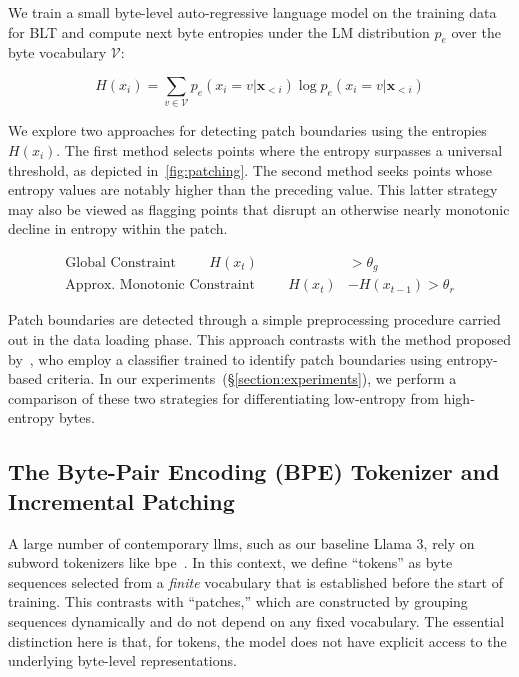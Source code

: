 We train a small byte-level auto-regressive language model on the training data for {\textsc BLT} and compute next byte entropies under the LM distribution $p_{e}$ over the byte vocabulary $\mathcal{V}$:

\begin{equation}
H(x_i) = \sum_{v \in \mathcal{V}} p_{e}(x_i=v|\pmb{x}_{<i}) \log p_{e}(x_i=v|\pmb{x}_{<i})
\end{equation}

We explore two approaches for detecting patch boundaries using the entropies $H(x_i)$. The first method selects points where the entropy surpasses a universal threshold, as depicted in~\autoref{fig:patching}. The second method seeks points whose entropy values are notably higher than the preceding value. This latter strategy may also be viewed as flagging points that disrupt an otherwise nearly monotonic decline in entropy within the patch.

\begin{align*}
    \text{Global Constraint}\hspace{1cm}H(x_t)& > \theta_g\\
    \text{Approx. Monotonic Constraint}\hspace{1cm}H(x_t)& - H(x_{t-1}) > \theta_r
\end{align*}

Patch boundaries are detected through a simple preprocessing procedure carried out in the data loading phase. This approach contrasts with the method proposed by~\citet{nawrot-etal-2023-efficient}, who employ a classifier trained to identify patch boundaries using entropy-based criteria. In our experiments~(\S\ref{section:experiments}), we perform a comparison of these two strategies for differentiating low-entropy from high-entropy bytes.

\subsection{The Byte-Pair Encoding (BPE) Tokenizer and Incremental Patching}
\label{section:incremental-patching}
\label{section:bpe-patch}

A large number of contemporary llms, such as our baseline Llama 3, rely on subword tokenizers like bpe~\citep{gage1994new, sennrich-etal-2016-neural}. In this context, we define ``tokens'' as byte sequences selected from a \textit{finite} vocabulary that is established before the start of training. This contrasts with ``patches,'' which are constructed by grouping sequences dynamically and do not depend on any fixed vocabulary. The essential distinction here is that, for tokens, the model does not have explicit access to the underlying byte-level representations.

